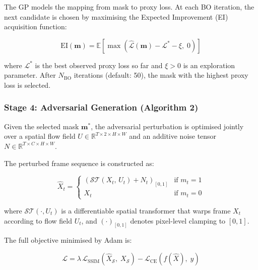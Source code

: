 The GP models the mapping from mask to proxy loss.
At each BO iteration, the next candidate is chosen by
maximising the Expected Improvement (EI) acquisition function:

\begin{equation}
    \mathrm{EI}(\mathbf{m}) =
        \mathbb{E}\!\left[
            \max\!\left(
                \hat{\mathcal{L}}(\mathbf{m}) - \mathcal{L}^{*} - \xi,\; 0
            \right)
        \right]
    \label{eq:ei}
\end{equation}

\noindent
where $\mathcal{L}^{*}$ is the best observed proxy loss so far
and $\xi > 0$ is an exploration parameter.
After $N_{\text{BO}}$ iterations (default: 50),
the mask with the highest proxy loss is selected.

\subsubsection{Stage 4: Adversarial Generation (Algorithm 2)}

Given the selected mask $\mathbf{m}^*$, the adversarial perturbation
is optimised jointly over a spatial flow field $U \in \mathbb{R}^{T \times 2 \times H \times W}$
and an additive noise tensor $N \in \mathbb{R}^{T \times C \times H \times W}$.

The perturbed frame sequence is constructed as:

\begin{equation}
    \hat{X}_t =
    \begin{cases}
        \left( \mathcal{ST}(X_t,\, U_t) + N_t \right)_{[0,1]} & \text{if } m_t = 1 \\
        X_t & \text{if } m_t = 0
    \end{cases}
    \label{eq:perturbed-frame}
\end{equation}

\noindent
where $\mathcal{ST}(\cdot, U_t)$ is a differentiable spatial
transformer that warps frame $X_t$ according to flow field $U_t$,
and $(\cdot)_{[0,1]}$ denotes pixel-level clamping to $[0,1]$.

The full objective minimised by Adam is:

\begin{equation}
    \mathcal{L} =
        \lambda \, \mathcal{L}_{\text{SSIM}}\!\left(
            \hat{X}_{\mathcal{S}},\; X_{\mathcal{S}}
        \right)
        - \mathcal{L}_{\text{CE}}\!\left(
            f(\hat{X}),\; y
        \right)
    \label{eq:main-loss}
\end{equation}

